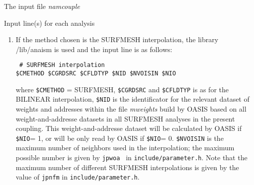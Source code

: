 \begin{subsection}{The input file {\it namcouple}}
\begin{subsubsection}{Input line(s) for each analysis}
\begin{itemize}
\begin{enumerate}
\item If the method chosen is the SURFMESH interpolation, the library
/lib/anaism is used and  the input line is
as  follows:
\begin{verbatim}
 # SURFMESH interpolation
$CMETHOD $CGRDSRC $CFLDTYP $NID $NVOISIN $NIO  
\end{verbatim}
where {\tt \$CMETHOD} = SURFMESH, {\tt \$CGRDSRC} and {\tt \$CFLDTYP} is
as for the BILINEAR interpolation,
{\tt \$NID} is the identificator for the relevant dataset 
of weights and addresses within the file {\em mweights} 
build by OASIS based on all
weight-and-addresse datasets in all SURFMESH analyses in the present
coupling. This weight-and-addresse dataset will be
calculated by OASIS if {\tt \$NIO}= 1, or will be only read by OASIS if 
{\tt \$NIO}= 0. {\tt \$NVOISIN} is the maximum number of neighbors used in
the interpolation; the maximum possible number is given by {\tt jpwoa
} in {\tt include/parameter.h}. Note that
the maximum number of different SURFMESH interpolations is given by the
value of {\tt jpnfm} in {\tt include/parameter.h}.


\end{enumerate}
\end{itemize}
\end{subsubsection}
\end{subsection}
